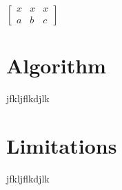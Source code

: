 \documentclass[
10pt, %
letterpaper, %
oneside, %
headinclude,footinclude, %
BCOR5mm, %
]{scrartcl}
\begin{document}
$\begin{bmatrix}
x & x & x\\
a & b & c
\end{bmatrix}$

\pagebreak
\section{Algorithm} %
jfkljflkdjlk


\pagebreak
\section{Limitations} %
jfkljflkdjlk
\end{document}
